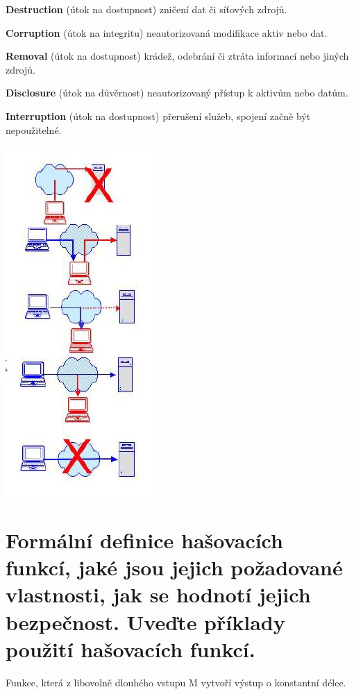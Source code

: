 \begin{multicols}{2}
\noindent \textbf{Destruction} (útok na dostupnost) zničení dat či síťových zdrojů.

\noindent \textbf{Corruption} (útok na integritu) neautorizovaná modifikace aktiv nebo dat.

\noindent \textbf{Removal} (útok na dostupnost) krádež, odebrání či ztráta informací nebo jiných zdrojů.

\noindent \textbf{Disclosure} (útok na důvěrnost) neautorizovaný přístup k aktivům nebo datům.

\noindent \textbf{Interruption} (útok na dostupnost) přerušení služeb, spojení začně být nepoužitelné.

\begin{center}
    \includegraphics[scale = 0.8]{images/threatModel.JPG}
\end{center}
\end{multicols}


\section{Formální definice hašovacích funkcí, jaké jsou jejich požadované vlastnosti, jak se hodnotí jejich bezpečnost. Uveďte příklady použití hašovacích funkcí.}

Funkce, která z libovolně dlouhého vstupu M vytvoří výstup o konstantní délce.

